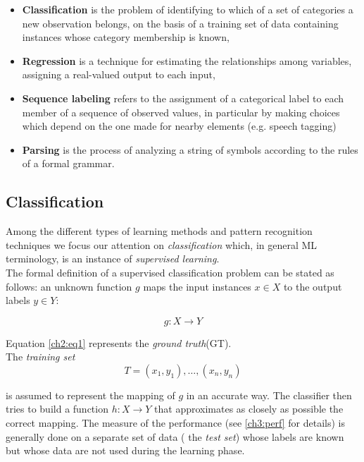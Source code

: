 \begin{itemize}
 \item \textbf{Classification} is the problem of identifying to which of a set of categories a new observation belongs, on the basis
 of a training set of data containing instances whose category membership is known,
 \item \textbf{Regression} is a technique for estimating the relationships among variables, assigning a real-valued output to each input,
 \item \textbf{Sequence labeling} refers to the assignment of a categorical label to each member of a sequence of observed values,
 in particular by making choices which depend on the one made for nearby elements (e.g. speech tagging)
 \item \textbf{Parsing} is the process of analyzing a string of symbols according to the rules of a formal grammar.
\end{itemize}

\subsection{Classification}

Among the different types of learning methods and pattern recognition techniques we focus our attention on \textit{classification} which, in general \Gls{ML} 
terminology, is an instance of \textit{supervised learning}.\\
The formal definition of a supervised classification problem can be stated as follows: an unknown function $g$ maps the input instances $x \in X$ to the output labels $y \in Y$:

\begin{equation}
 \label{ch2:eq1}
 g: X \rightarrow Y
\end{equation}

Equation \ref{ch2:eq1} represents the \textit{ground truth}(GT).\\
The \textit{training set}
\begin{equation}
 T = { (x_1,y_1), \ldots ,(x_n,y_n) }
\end{equation}

is assumed to represent the mapping of $g$ in an accurate way. The classifier then tries to build a function $h: X \rightarrow Y$ that approximates as closely as possible the correct mapping. The measure of the performance
(see \ref{ch3:perf} for details) is generally done on a separate set of data ( the \textit{test set}) whose labels are known but whose data are not used during the learning phase\cite{liu2006pattern}.

